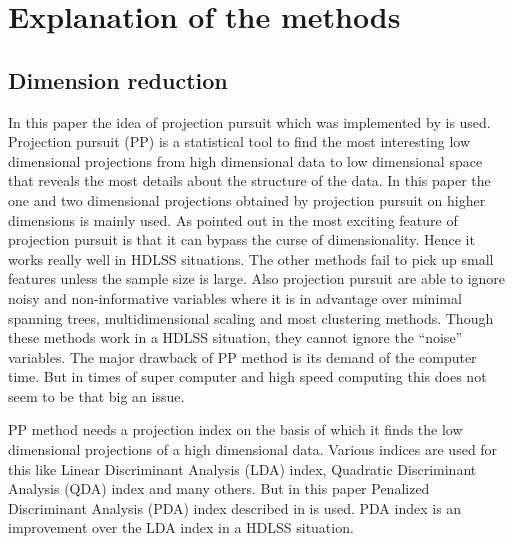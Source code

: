 
\section{Explanation of the methods}

 
\subsection{Dimension reduction}

In this paper the idea of projection pursuit which was implemented by \cite{friedman:1974} is used. Projection pursuit (PP) is a statistical tool to find the most interesting low dimensional projections from high dimensional data to low dimensional space that reveals the most details about the structure of the data. In this paper the one and two dimensional projections obtained by projection pursuit on higher dimensions is mainly used.  As pointed out in \cite{huber:1985} the most exciting feature of projection pursuit is that it can bypass the curse of dimensionality. Hence it works really well in HDLSS situations. The other methods fail to pick up small features unless the sample size is large. Also projection pursuit are able to ignore noisy and non-informative variables where it is in advantage over minimal spanning trees, multidimensional scaling and most clustering methods. Though these methods work in a HDLSS situation, they cannot ignore the ``noise'' variables. The  major drawback of PP method is its demand of the computer time. But in times of super computer and high speed computing this does not seem to be that big an issue.

PP method needs a projection index on the basis of which it finds the low dimensional projections of a high dimensional data. Various indices are used for this like Linear Discriminant Analysis (LDA) index, Quadratic Discriminant Analysis (QDA) index and many others. But in this paper Penalized Discriminant Analysis (PDA) index described in \cite{lee:2009} is used. PDA index is an improvement over the LDA index in a HDLSS situation. 


